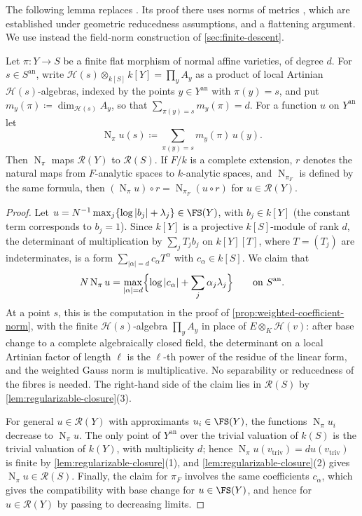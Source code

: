 \documentclass[11pt,a4paper]{article}
\newcommand{\an}{\mathrm{an}}          %
\newcommand{\vtriv}{v_{\mathrm{triv}}} %
\newcommand{\Norm}{\operatorname{N}}
\begin{document}
The following lemma replaces \cite[Proposition~6.11]{Wu26}. Its proof there uses norms of metrics \cite{BE21}, which are established under geometric reducedness assumptions, and a flattening argument. We use instead the field-norm construction of \cref{sec:finite-descent}.

\begin{lemma}\label{lem:finite-flat-norm}
Let $\pi\colon Y\to S$ be a finite flat morphism of normal affine varieties, of degree $d$. For $s\in S^{\an}$, write $\mathcal H(s)\otimes_{k[S]}k[Y]=\prod_yA_y$ as a product of local Artinian $\mathcal H(s)$-algebras, indexed by the points $y\in Y^{\an}$ with $\pi(y)=s$, and put $m_y(\pi)\coloneqq\dim_{\mathcal H(s)}A_y$, so that $\sum_{\pi(y)=s}m_y(\pi)=d$. For a function $u$ on $Y^{\an}$ let
\[
\Norm_\pi u(s)\coloneqq\sum_{\pi(y)=s}m_y(\pi)\,u(y).
\]
Then $\Norm_\pi$ maps $\mathcal{R}(Y)$ to $\mathcal{R}(S)$. If $F/k$ is a complete extension, $r$ denotes the natural maps from $F$-analytic spaces to $k$-analytic spaces, and $\Norm_{\pi_F}$ is defined by the same formula, then $(\Norm_\pi u)\circ r=\Norm_{\pi_F}(u\circ r)$ for $u\in\mathcal{R}(Y)$.
\end{lemma}

\begin{proof}
Let $u=N^{-1}\max_j\{\log|b_j|+\lambda_j\}\in\FS(Y)$, with $b_j\in k[Y]$ (the constant term corresponds to $b_j=1$). Since $k[Y]$ is a projective $k[S]$-module of rank $d$, the determinant of multiplication by $\sum_jT_jb_j$ on $k[Y][T]$, where $T=(T_j)$ are indeterminates, is a form $\sum_{|\alpha|=d}c_\alpha T^\alpha$ with $c_\alpha\in k[S]$. We claim that
\[
N\Norm_\pi u=\max_{|\alpha|=d}\Bigl\{\log|c_\alpha|+\sum_j\alpha_j\lambda_j\Bigr\}\qquad\text{on }S^{\an}.
\]
At a point $s$, this is the computation in the proof of \cref{prop:weighted-coefficient-norm}, with the finite $\mathcal H(s)$-algebra $\prod_yA_y$ in place of $E\otimes_K\mathcal H(v)$: after base change to a complete algebraically closed field, the determinant on a local Artinian factor of length $\ell$ is the $\ell$-th power of the residue of the linear form, and the weighted Gauss norm is multiplicative. No separability or reducedness of the fibres is needed. The right-hand side of the claim lies in $\mathcal{R}(S)$ by \cref{lem:regularizable-closure}(3).

For general $u\in\mathcal{R}(Y)$ with approximants $u_i\in\FS(Y)$, the functions $\Norm_\pi u_i$ decrease to $\Norm_\pi u$. The only point of $Y^{\an}$ over the trivial valuation of $k(S)$ is the trivial valuation of $k(Y)$, with multiplicity $d$; hence $\Norm_\pi u(\vtriv)=du(\vtriv)$ is finite by \cref{lem:regularizable-closure}(1), and \cref{lem:regularizable-closure}(2) gives $\Norm_\pi u\in\mathcal{R}(S)$. Finally, the claim for $\pi_F$ involves the same coefficients $c_\alpha$, which gives the compatibility with base change for $u\in\FS(Y)$, and hence for $u\in\mathcal{R}(Y)$ by passing to decreasing limits.
\end{proof}
\end{document}
